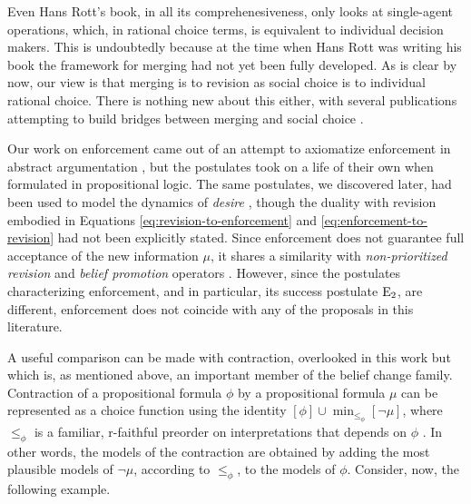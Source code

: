 Even Hans Rott's book, in all its comprehenesiveness, only looks at 
single-agent operations, which, in rational choice terms, is 
equivalent to individual decision makers. 
This is undoubtedly because at the time when Hans Rott was writing his book
the framework for merging \cite{LiberatoreS98,KoniecznyP02,KoniecznyM04,KoniecznyP11}
had not yet been fully developed.
As is clear by now, our view is that merging is to revision as social choice 
is to individual rational choice. There is nothing new about this either,
with several publications attempting to build bridges between merging 
and social choice \cite{Meyer01,MeyerGC01,KoniecznyP05,EckertP05,EveraereKM07,EveraereKM14,DiazP17,EveraereKM17}.

Our work on enforcement came out of an attempt to axiomatize enforcement in
abstract argumentation \cite{Baumann12,WallnerNJ17}, but the postulates took on 
a life of their own when formulated in propositional logic. 
The same postulates, we discovered later, had been used to model the dynamics of \emph{desire} 
\cite{DuboisLP17}, though the duality with revision embodied in Equations 
\ref{eq:revision-to-enforcement} and \ref{eq:enforcement-to-revision} had not been explicitly stated.
Since enforcement does not guarantee full acceptance of the new information $\mu$, 
it shares a similarity with \emph{non-prioritized revision} \cite{Hansson99b,HanssonFCF01}
and \emph{belief promotion} operators \cite{SchwindKM18}.
However, since the postulates characterizing enforcement, and in particular, 
its success postulate $\mathrm{E}_{2}$, are different, enforcement does not coincide 
with any of the proposals in this literature.

A useful comparison can be made with contraction, 
overlooked in this work but which is, as mentioned above,
an important member of the belief change family.
Contraction of a propositional formula $\phi$ by a 
propositional formula $\mu$ can be represented as a choice 
function using the identity $[\phi]\cup\min_{\le_{\phi}}[\lnot\mu]$,
where $\le_{\phi}$ is a familiar, r-faithful preorder on interpretations that 
depends on $\phi$ \cite{CaridroitKM17}. In other words,
the models of the contraction are obtained by adding 
the most plausible models of $\lnot\mu$, according to $\le_{\phi}$,
to the models of $\phi$.
Consider, now, the following example.

